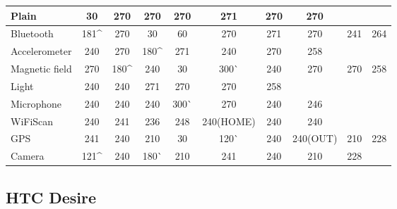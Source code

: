 \begin{table}
    \begin{tabular}{| l | c | c | c | c | c | c | c | c | c |}
    \hline
    Plain          & \cellcolor{red!25}30  & 270  & 270   & 270   & 271       & 270 & 270      & ~   & ~   \\ \hline
    Bluetooth      & 181\^ & 270  & \cellcolor{red!25}30   & \cellcolor{red!25}60   & 270       & 271 & 270      & 241 & 264 \\ \hline
    Accelerometer  & 240  & 270  & 180\^ & 271   & 240       & 270 & 258      & ~   & ~   \\ \hline
    Magnetic field & 270  & 180\^ & 240   & \cellcolor{red!25}30   & 300^^   & 240 & 270      & 270 & 258 \\ \hline
    Light          & 240  & 240  & 271   & 270   & 270       & 258 & ~        & ~   & ~   \\ \hline
    Microphone     & 240  & 240  & 240   & 300^^ & 270       & 240 & 246      & ~   & ~   \\ \hline
    WiFiScan       & 240  & 241  & 236   & 248   & 240(HOME) & 240 & 240      & ~   & ~   \\ \hline
    GPS            & 241  & 240  & 210   & \cellcolor{red!25}30   & 120^^   & 240 & 240(OUT) & 210 & 228 \\ \hline
    Camera         & 121\^ & 240  & 180^^ & 210   & 241       & 240 & 210      & 228 & ~   \\ \hline
    \end{tabular}
\end{table}



\subsection{HTC Desire}	

